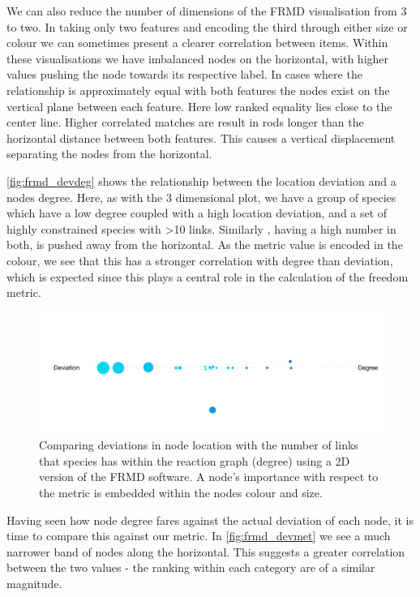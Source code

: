      We can also reduce the number of dimensions of the FRMD visualisation from 3 to two. In taking only two features and encoding the third through either size or colour we can sometimes present a clearer correlation between items. Within these visualisations we have imbalanced nodes on the horizontal, with higher values pushing the node towards its respective label. In cases where the relationship is approximately equal with both features the nodes exist on the vertical plane between each feature. Here low ranked equality lies close to the center line. Higher correlated matches are result in rods longer than the horizontal distance between both features. This causes a vertical displacement separating the nodes from the horizontal. 
     
     \autoref{fig:frmd_devdeg} shows the relationship between the location deviation and a nodes degree. Here, as with the 3 dimensional plot, we have a group of species which have a low degree coupled with a high location deviation, and a set of highly constrained species with >10 links. Similarly , having a high number in both, is pushed away from the horizontal. As the metric value is encoded in the colour, we see that this has a stronger correlation with degree than deviation, which is expected since this plays a central role in the calculation of the freedom metric. 
     
    \begin{figure}[H]
         \centering
     \includegraphics[width=\textwidth]{figures_c1/devdeg.png}
     \caption{Comparing deviations in node location with the number of links that species has within the reaction graph (degree) using a 2D version of the FRMD software. A node's importance with respect to the metric is embedded within the nodes colour and size.}
     \label{fig:frmd_devdeg}
     \end{figure}

    

Having seen how node degree fares against the actual deviation of each node, it is time to compare this against our metric. In \autoref{fig:frmd_devmet} we see a much narrower band of nodes along the horizontal. This suggests a greater correlation between the two values - the ranking within each category are of a similar magnitude. 


